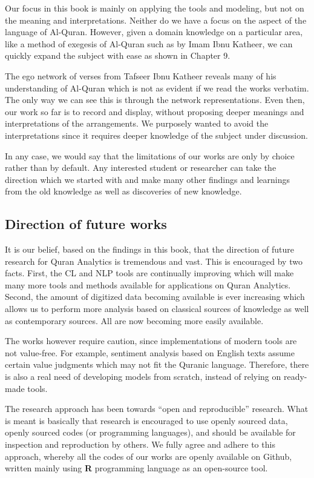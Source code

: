\documentclass[
]{article}
\begin{document}
Our focus in this book is mainly on applying the tools and modeling, but not on the meaning and interpretations. Neither do we have a focus on the aspect of the language of Al-Quran. However, given a domain knowledge on a particular area, like a method of exegesis of Al-Quran such as by Imam Ibnu Katheer, we can quickly expand the subject with ease as shown in Chapter 9.

The ego network of verses from Tafseer Ibnu Katheer reveals many of his understanding of Al-Quran which is not as evident if we read the works verbatim. The only way we can see this is through the network representations. Even then, our work so far is to record and display, without proposing deeper meanings and interpretations of the arrangements. We purposely wanted to avoid the interpretations since it requires deeper knowledge of the subject under discussion.

In any case, we would say that the limitations of our works are only by choice rather than by default. Any interested student or researcher can take the direction which we started with and make many other findings and learnings from the old knowledge as well as discoveries of new knowledge.

\hypertarget{direction-of-future-works}{%
\subsection*{Direction of future works}\label{direction-of-future-works}}

It is our belief, based on the findings in this book, that the direction of future research for Quran Analytics is tremendous and vast. This is encouraged by two facts. First, the CL and NLP tools are continually improving which will make many more tools and methods available for applications on Quran Analytics. Second, the amount of digitized data becoming available is ever increasing which allows us to perform more analysis based on classical sources of knowledge as well as contemporary sources. All are now becoming more easily available.

The works however require caution, since implementations of modern tools are not value-free. For example, sentiment analysis based on English texts assume certain value judgments which may not fit the Quranic language. Therefore, there is also a real need of developing models from scratch, instead of relying on ready-made tools.

The research approach has been towards ``open and reproducible'' research. What is meant is basically that research is encouraged to use openly sourced data, openly sourced codes (or programming languages), and should be available for inspection and reproduction by others. We fully agree and adhere to this approach, whereby all the codes of our works are openly available on Github, written mainly using \textbf{R} programming language as an open-source tool.
\end{document}
